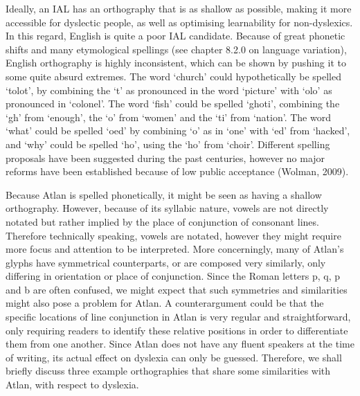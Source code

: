Ideally, an IAL has an orthography that is as shallow as possible, making it more accessible for dyslectic people, as well as optimising learnability for non-dyslexics. In this regard, English is quite a poor IAL candidate. Because of great phonetic shifts and many etymological spellings (see chapter 8.2.0 on language variation), English orthography is highly inconsistent, which can be shown by pushing it to some quite absurd extremes. The word ‘church’ could hypothetically be spelled ‘tolot’, by combining the ‘t’ as pronounced in the word ‘picture’ with ‘olo’ as pronounced in ‘colonel’. The word ‘fish’ could be spelled ‘ghoti’, combining the ‘gh’ from ‘enough’, the ‘o’ from ‘women’ and the ‘ti’ from ‘nation’. The word ‘what’ could be spelled ‘oed’ by combining ‘o’ as in ‘one’ with ‘ed’ from ‘hacked’, and ‘why’ could be spelled ‘ho’, using the ‘ho’ from ‘choir’. Different spelling proposals have been suggested during the past centuries, however no major reforms have been established because of low public acceptance (Wolman, 2009). 

Because Atlan is spelled phonetically, it might be seen as having a shallow orthography. However, because of its syllabic nature, vowels are not directly notated but rather implied by the place of conjunction of consonant lines. Therefore technically speaking, vowels are notated, however they might require more focus and attention to be interpreted. More concerningly, many of Atlan’s glyphs have symmetrical counterparts, or are composed very similarly, only differing in orientation or place of conjunction. Since the Roman letters p, q, p and b are often confused, we might expect that such symmetries and similarities might also pose a problem for Atlan. A counterargument could be that the specific locations of line conjunction in Atlan is very regular and straightforward, only requiring readers to identify these relative positions in order to differentiate them from one another. Since Atlan does not have any fluent speakers at the time of writing, its actual effect on dyslexia can only be guessed. Therefore, we shall briefly discuss three example orthographies that share some similarities with Atlan, with respect to dyslexia. 

